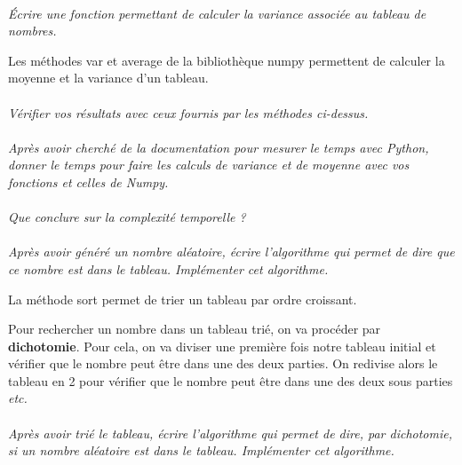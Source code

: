 \documentclass[11pt,oneside]{article}
\begin{document}
\paragraph{}
\textit{Écrire une fonction permettant de calculer la variance associée au tableau de nombres.}

Les méthodes \textsf{var} et \textsf{average} de la bibliothèque \textsf{numpy} permettent de 
calculer la moyenne et la variance d'un tableau. 


\paragraph{}
\textit{Vérifier vos résultats avec ceux fournis par les méthodes ci-dessus.}

\paragraph{}
\textit{Après avoir cherché de la documentation pour mesurer le temps avec Python, donner le temps pour faire les calculs de variance et de moyenne avec vos fonctions et celles de Numpy.}

\paragraph{}
\textit{Que conclure sur la complexité temporelle ?}

\paragraph{}
\textit{Après avoir généré un nombre aléatoire, écrire l'algorithme qui permet de dire que ce nombre est dans le tableau. Implémenter cet algorithme.}

La méthode \textsf{sort} permet de trier un tableau par ordre croissant. 

Pour rechercher un nombre dans un tableau trié, on va procéder par \textbf{dichotomie}. Pour cela, on va diviser une première fois notre tableau initial et vérifier que le nombre peut être dans une des deux parties. On redivise alors le tableau en 2 pour vérifier que le nombre peut être dans une des deux sous parties \textit{etc.}



\paragraph{}
\textit{Après avoir trié le tableau, écrire l'algorithme qui permet de dire, par dichotomie, si un nombre aléatoire est dans le tableau. Implémenter cet algorithme.}
\end{document}
